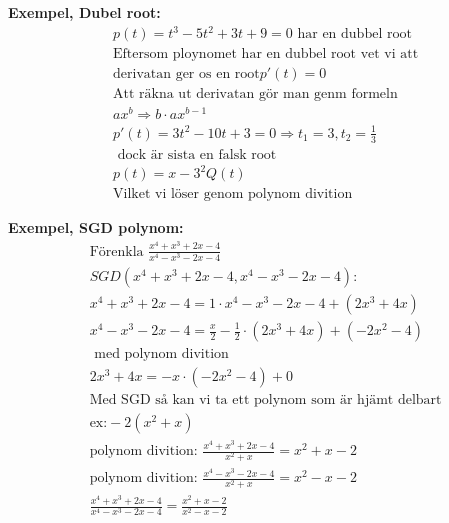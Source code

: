 \begin{multicols}{2}
\textbf{Exempel, Dubel root:}
\begin{align*}
  &p(t)= t^3 -5t^2 +3t +9 = 0 \text{ har en dubbel root} \\
  &\text{Eftersom ploynomet har en dubbel root vet vi att} \\
  &\text{derivatan ger os en root} p'(t)=0  \\
  &\text{Att räkna ut derivatan gör man genm formeln } \\
  &ax^b \Rightarrow b\cdot ax^{b-1} \\
  &p'(t) = 3t^2 -10t +3 = 0 \Rightarrow t_1=3,t_2=\frac{1}{3} \\
  &\text{ dock är sista en falsk root} \\
  &p(t) = {x-3}^2Q(t) \\ 
  &\text{Vilket vi löser genom polynom divition}
\end{align*}

\textbf{Exempel, SGD polynom:}
\begin{align*}
  &\text{Förenkla } \frac{x^4+x^3+2x-4}{x^4-x^3-2x-4} \\
  &SGD(x^4+x^3+2x-4, x^4-x^3-2x-4):  \\
  &x^4+x^3+2x-4 = 1 \cdot x^4-x^3-2x-4 + (2x^3 +4x) \\
  &x^4-x^3-2x-4 = \frac{x}{2}-\frac{1}{2} \cdot (2x^3 +4x) + (-2x^2-4) \\
  &\text{ med polynom divition} \\
  &2x^3 +4x = -x \cdot (-2x^2-4) +0 \\
  &\text{Med SGD så kan vi ta ett polynom som är hjämt delbart} \\
  &\text{ex:} -2(x^2+x) \\
  &\text{polynom divition: } \frac{x^4+x^3+2x-4}{x^2+x} = x^2+x-2 \\
  &\text{polynom divition: } \frac{x^4-x^3-2x-4}{x^2+x} = x^2-x-2 \\
  &\frac{x^4+x^3+2x-4}{x^4-x^3-2x-4} = \frac{x^2+x-2}{x^2-x-2} \\  
\end{align*}
\end{multicols}
\raggedcolumns

